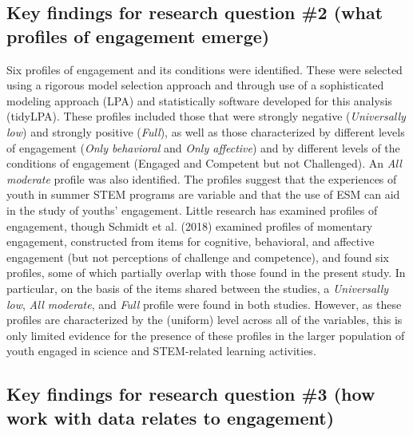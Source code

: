 \documentclass[]{book}
\theoremstyle{definition}
\theoremstyle{definition}
\theoremstyle{definition}
\theoremstyle{remark}
\begin{document}
\subsection{Key findings for research question \#2 (what profiles of
engagement
emerge)}\label{key-findings-for-research-question-2-what-profiles-of-engagement-emerge}

Six profiles of engagement and its conditions were identified. These
were selected using a rigorous model selection approach and through use
of a sophisticated modeling approach (LPA) and statistically software
developed for this analysis (tidyLPA). These profiles included those
that were strongly negative (\emph{Universally low}) and strongly
positive (\emph{Full}), as well as those characterized by different
levels of engagement (\emph{Only behavioral} and \emph{Only affective})
and by different levels of the conditions of engagement (Engaged and
Competent but not Challenged). An \emph{All moderate} profile was also
identified. The profiles suggest that the experiences of youth in summer
STEM programs are variable and that the use of ESM can aid in the study
of youths' engagement. Little research has examined profiles of
engagement, though Schmidt et al. (2018) examined profiles of momentary
engagement, constructed from items for cognitive, behavioral, and
affective engagement (but not perceptions of challenge and competence),
and found six profiles, some of which partially overlap with those found
in the present study. In particular, on the basis of the items shared
between the studies, a \emph{Universally low}, \emph{All moderate}, and
\emph{Full} profile were found in both studies. However, as these
profiles are characterized by the (uniform) level across all of the
variables, this is only limited evidence for the presence of these
profiles in the larger population of youth engaged in science and
STEM-related learning activities.

\subsection{Key findings for research question \#3 (how work with data
relates to
engagement)}\label{key-findings-for-research-question-3-how-work-with-data-relates-to-engagement}
\end{document}
